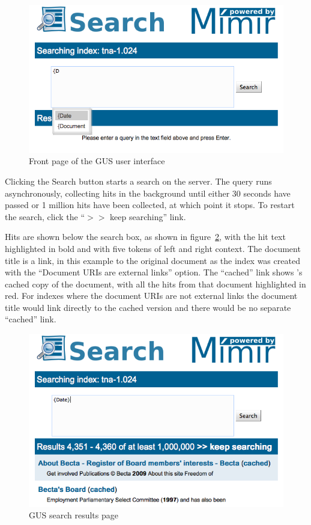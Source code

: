 \begin{figure}[tbp]
\begin{center}
\includegraphics[scale=0.5]{gus-front-page}
\caption{Front page of the GUS user interface}
\label{fig:gus:front-page}
\end{center}
\end{figure}

Clicking the Search button starts a search on the server.  The query runs
asynchronously, collecting hits in the background until either 30 seconds have
passed or 1 million hits have been collected, at which point it stops.  To
restart the search, click the ``$>>$ keep searching'' link.

Hits are shown below the search box, as shown in figure~\ref{fig:gus:results},
with the hit text highlighted in bold and with five tokens of left and right
context.  The document title is a link, in this example to the original
document as the index was created with the ``Document URIs are external links''
option.  The ``cached'' link shows \Mimir's cached copy of the document, with
all the hits from that document highlighted in red.  For indexes where the
document URIs are not external links the document title would link directly to
the cached version and there would be no separate ``cached'' link.

\begin{figure}[tbp]
\begin{center}
\includegraphics[scale=0.5]{gus-search-results}
\caption{GUS search results page}
\label{fig:gus:results}
\end{center}
\end{figure}

